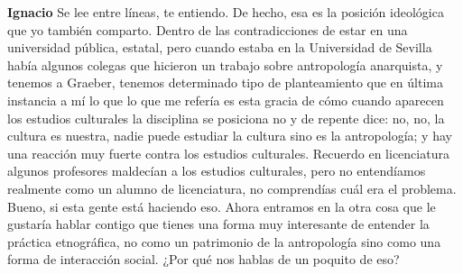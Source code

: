 \documentclass[
  spanish,
  11pt,
  a4paper,
]{scrbook}
\newenvironment{transcripcion}{
    \begin{list}{}{
        \setlength{\leftmargin}{1.5em}  %
        \setlength{\rightmargin}{0em}
        \setlength{\itemsep}{0.2em}     %
        \setlength{\parsep}{0.0em}
        \setlength{\listparindent}{0pt}
    }
}{
    \end{list}
}
\newcommand{\personaje}[1]{\textbf{#1}\quad}
\begin{document}
\begin{transcripcion}
\item \personaje{Ignacio} Se lee entre líneas, te entiendo. De hecho, esa es la posición ideológica que yo también comparto. Dentro de las contradicciones de estar en una universidad pública, estatal, pero cuando estaba en la Universidad de Sevilla había algunos colegas que hicieron un trabajo sobre antropología anarquista, y tenemos a Graeber, tenemos determinado tipo de planteamiento que en última instancia a mí lo que lo que me refería es esta gracia de cómo cuando aparecen los estudios culturales la disciplina se posiciona no y de repente dice: no, no, la cultura es nuestra, nadie puede estudiar la cultura sino es la antropología; y hay una reacción muy fuerte contra los estudios culturales. Recuerdo en licenciatura algunos profesores maldecían a los estudios culturales, pero no entendíamos realmente como un alumno de licenciatura, no comprendías cuál era el problema. Bueno, si esta gente está haciendo eso. Ahora entramos en la otra cosa que le gustaría hablar contigo que tienes una forma muy interesante de entender la práctica etnográfica, no como un patrimonio de la antropología sino como una forma de interacción social. ¿Por qué nos hablas de un poquito de eso?


\end{transcripcion}
\end{document}
